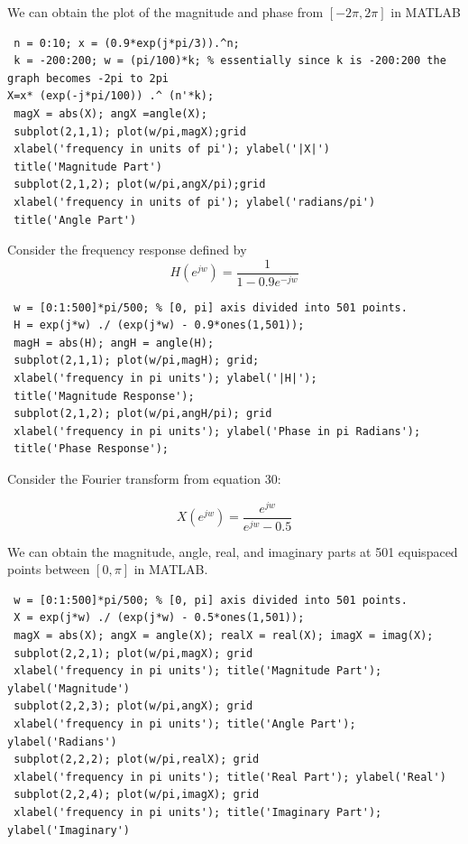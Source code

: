 \documentclass{article}
\begin{document}
We can obtain the plot of the magnitude and phase from $[-2\pi,2\pi]$ in MATLAB
\begin{lstlisting}
 n = 0:10; x = (0.9*exp(j*pi/3)).^n;
 k = -200:200; w = (pi/100)*k; % essentially since k is -200:200 the graph becomes -2pi to 2pi
X=x* (exp(-j*pi/100)) .^ (n'*k);
 magX = abs(X); angX =angle(X);
 subplot(2,1,1); plot(w/pi,magX);grid
 xlabel('frequency in units of pi'); ylabel('|X|')
 title('Magnitude Part')
 subplot(2,1,2); plot(w/pi,angX/pi);grid
 xlabel('frequency in units of pi'); ylabel('radians/pi')
 title('Angle Part')
\end{lstlisting}
Consider the frequency response defined by
\begin{equation}
H(e^{jw})= \frac{1}{1-0.9e^{-jw}}
\end{equation}
\begin{lstlisting}
 w = [0:1:500]*pi/500; % [0, pi] axis divided into 501 points.
 H = exp(j*w) ./ (exp(j*w) - 0.9*ones(1,501));
 magH = abs(H); angH = angle(H);
 subplot(2,1,1); plot(w/pi,magH); grid;
 xlabel('frequency in pi units'); ylabel('|H|');
 title('Magnitude Response');
 subplot(2,1,2); plot(w/pi,angH/pi); grid
 xlabel('frequency in pi units'); ylabel('Phase in pi Radians');
 title('Phase Response');    
\end{lstlisting}
\newpage
Consider the Fourier transform from equation 30: 
\begin{center}
$$X(e^{jw})= \frac{e^{jw}}{e^{jw}-0.5}$$
\end{center}
We can obtain the magnitude, angle, real, and imaginary parts at 501 equispaced points between $[0,\pi]$ in MATLAB.
\begin{lstlisting}
 w = [0:1:500]*pi/500; % [0, pi] axis divided into 501 points.
 X = exp(j*w) ./ (exp(j*w) - 0.5*ones(1,501));
 magX = abs(X); angX = angle(X); realX = real(X); imagX = imag(X);
 subplot(2,2,1); plot(w/pi,magX); grid
 xlabel('frequency in pi units'); title('Magnitude Part'); ylabel('Magnitude')
 subplot(2,2,3); plot(w/pi,angX); grid
 xlabel('frequency in pi units'); title('Angle Part'); ylabel('Radians')
 subplot(2,2,2); plot(w/pi,realX); grid
 xlabel('frequency in pi units'); title('Real Part'); ylabel('Real')
 subplot(2,2,4); plot(w/pi,imagX); grid
 xlabel('frequency in pi units'); title('Imaginary Part'); ylabel('Imaginary')    
\end{lstlisting}
\end{document}
